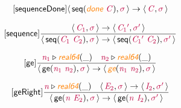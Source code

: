 \documentclass[10pt,leqno,fleqn]{article}
\newcommand{\artVariable}[1]{\mbox{\color{purple}\em #1\/}}
\newcommand{\artConstructor}[1]{\mbox{\sf #1}}
\newcommand{\artSpecial}[1]{\mbox{\color{orange}\sf\em #1}}
\begin{document}
\begin{equation}
\tag*{[\artConstructor{\sf sequenceDone}]}
\begin{split}\langle\, \artConstructor{\sf seq}(\artSpecial{done}\ \artVariable{C}), \artVariable{$\sigma$}\,\rangle \rightarrow \langle\, \artVariable{C}, \artVariable{$\sigma$}\,\rangle 
\end{split}
\end{equation}

\begin{equation}
\tag*{[\artConstructor{\sf sequence}]}
\begin{split}\frac{\langle\, \artVariable{C$_{1}$}, \artVariable{$\sigma$}\,\rangle \rightarrow \langle\, \artVariable{C$_{1}$\/$^\prime$}, \artVariable{$\sigma$\/$^\prime$}\,\rangle }{\langle\, \artConstructor{\sf seq}(\artVariable{C$_{1}$}\ \artVariable{C$_{2}$}), \artVariable{$\sigma$}\,\rangle \rightarrow \langle\, \artConstructor{\sf seq}(\artVariable{C$_{1}$\/$^\prime$}\ \artVariable{C$_{2}$}), \artVariable{$\sigma$\/$^\prime$}\,\rangle }
\end{split}
\end{equation}

\begin{equation}
\tag*{[\artConstructor{\sf ge}]}
\begin{split}\frac{ \artVariable{n$_{1}$}\triangleright \artSpecial{real64}(\_) \quad  \artVariable{n$_{2}$}\triangleright \artSpecial{real64}(\_) }{\langle\, \artConstructor{\sf ge}(\artVariable{n$_{1}$}\ \artVariable{n$_{2}$}), \artVariable{$\sigma$}\,\rangle \rightarrow \langle\, \artSpecial{ge}(\artVariable{n$_{1}$}\ \artVariable{n$_{2}$}), \artVariable{$\sigma$}\,\rangle }
\end{split}
\end{equation}

\begin{equation}
\tag*{[\artConstructor{\sf geRight}]}
\begin{split}\frac{ \artVariable{n}\triangleright \artSpecial{real64}(\_) \quad \langle\, \artVariable{E$_{2}$}, \artVariable{$\sigma$}\,\rangle \rightarrow \langle\, \artVariable{I$_{2}$}, \artVariable{$\sigma$\/$^\prime$}\,\rangle }{\langle\, \artConstructor{\sf ge}(\artVariable{n}\ \artVariable{E$_{2}$}), \artVariable{$\sigma$}\,\rangle \rightarrow \langle\, \artConstructor{\sf ge}(\artVariable{n}\ \artVariable{I$_{2}$}), \artVariable{$\sigma$\/$^\prime$}\,\rangle }
\end{split}
\end{equation}
\end{document}
